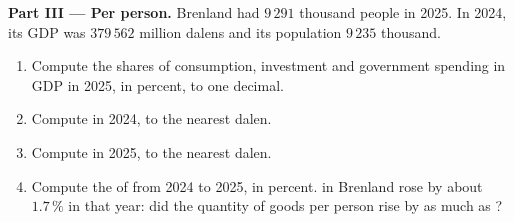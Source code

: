 \begin{problem}
\medskip
\noindent\textbf{Part III --- Per person.} Brenland had $9\,291$ thousand people in 2025. In
2024, its GDP was $379\,562$ million dalens and its population $9\,235$ thousand.
\begin{enumerate}[resume]
  \item Compute the shares of consumption, investment and government spending in GDP in 2025, in
        percent, to one decimal.
  \item Compute  in 2024, to the nearest dalen.
  \item Compute  in 2025, to the nearest dalen.
  \item Compute the  of  from 2024 to 2025, in percent.  in
        Brenland rose by about $1.7\,\%$ in that year: did the quantity of goods per person rise by
        as much as ?
\end{enumerate}
\end{problem}
